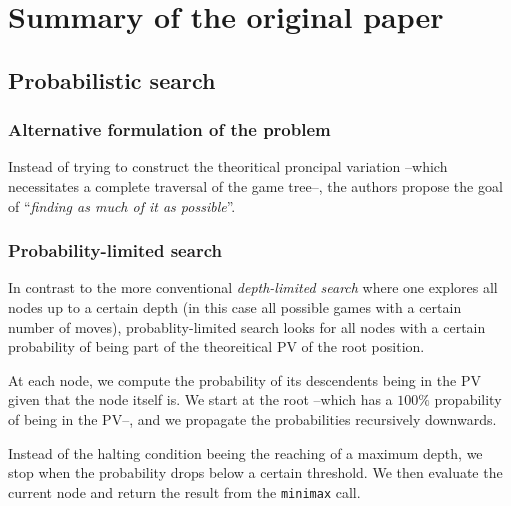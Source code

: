 
\chapter{Summary of the original paper}
    \section{Probabilistic search}
        \subsection{Alternative formulation of the problem}
        
            Instead of trying to construct the theoritical proncipal variation --which necessitates a complete traversal of the game tree--, the authors propose the goal of ``\emph{finding as much of it as possible}''.

        \subsection{Probability-limited search}

            In contrast to the more conventional \emph{depth-limited search} where one explores all nodes up to a certain depth (in this case all possible games with a certain number of moves), probablity-limited search looks for all nodes with a certain probability of being part of the theoreitical PV of the root position.
            
            At each node, we compute the probability of its descendents being in the PV given that the node itself is. We start at the root --which has a \(100\%\) propability of being in the PV--, and we propagate the probabilities recursively downwards.
            
            Instead of the halting condition beeing the reaching of a maximum depth, we stop when the probability drops below a certain threshold. We then evaluate the current node and return the result from the \verb|minimax| call.
